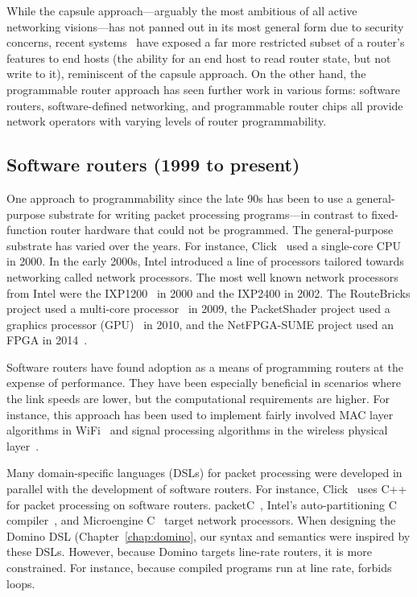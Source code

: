While the capsule approach---arguably the most ambitious of all active
networking visions---has not panned out in its most general form due to
security concerns, recent systems~\cite{int} have exposed a far more restricted
subset of a router's features to end hosts (\eg the ability for an end host to
read router state, but not write to it), reminiscent of the capsule approach.
On the other hand, the programmable router approach has seen further work in
various forms: software routers, software-defined networking, and programmable
router chips all provide network operators with varying levels of router
programmability.

\subsection{Software routers (1999 to present)}
One approach to programmability since the late 90s has been to use a
general-purpose substrate for writing packet processing programs---in contrast
to fixed-function router hardware that could not be programmed. The
general-purpose substrate has varied over the years. For instance,
Click~\cite{click} used a single-core CPU in 2000.  In the early 2000s, Intel
introduced a line of processors tailored towards networking called network
processors. The most well known network processors from Intel were the
IXP1200~\cite{ixp2400} in 2000 and the IXP2400 in 2002.  The RouteBricks
project used a multi-core processor~\cite{routebricks} in 2009, the
PacketShader project used a graphics processor (GPU)~\cite{packetshader} in
2010, and the NetFPGA-SUME project used an FPGA in 2014~\cite{netfgpa}.

Software routers have found adoption as a means of programming routers at the
expense of performance. They have been especially beneficial in scenarios where
the link speeds are lower, but the computational requirements are higher.  For
instance, this approach has been used to implement fairly involved MAC layer
algorithms in WiFi~\cite{samplerate, roofnet, xor} and signal processing
algorithms in the wireless physical layer~\cite{sdr, airblue, spinal_codes,
mota_bell_labs}.

Many domain-specific languages (DSLs) for packet processing were developed in
parallel with the development of software routers. For instance,
Click~\cite{click} uses C++ for packet processing on software routers.
packetC~\cite{packetc}, Intel's auto-partitioning C
compiler~\cite{intel_uiuc_pldi}, and Microengine C~\cite{microenginec} target
network processors. When designing the Domino DSL (Chapter~\ref{chap:domino},
our syntax and semantics were inspired by these DSLs.  However, because Domino
targets line-rate routers, it is more constrained. For instance, because
compiled programs run at line rate, \pktlanguage forbids loops.

